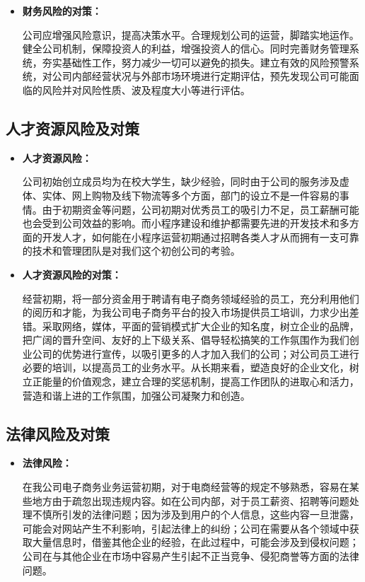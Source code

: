 \documentclass[UTF8,12pt]{ctexart}
\numberwithin{figure}{section}%
\begin{document}
\begin{spacing}{2}
\begin{itemize}
	\item \textbf{财务风险的对策：}
	
	公司应增强风险意识，提高决策水平。合理规划公司的运营，脚踏实地运作。健全公司机制，保障投资人的利益，增强投资人的信心。同时完善财务管理系统，夯实基础性工作，努力减少一切可以避免的损失。建立有效的风险预警系统，对公司内部经营状况与外部市场环境进行定期评估，预先发现公司可能面临的风险并对风险性质、波及程度大小等进行评估。
	
\end{itemize}
\subsection{人才资源风险及对策}

\begin{itemize}
	\item \textbf{人才资源风险：}
	
	公司初始创立成员均为在校大学生，缺少经验，同时由于公司的服务涉及虚体、实体、网上购物及线下物流等多个方面，部门的设立不是一件容易的事情。由于初期资金等问题，公司初期对优秀员工的吸引力不足，员工薪酬可能也会受到公司效益的影响。而小程序建设和维护都需要先进的开发技术和多方面的开发人才，如何能在小程序运营初期通过招聘各类人才从而拥有一支可靠的技术和管理团队是对我们这个初创公司的考验。
	
	\item \textbf{人才资源风险的对策：}
	
	经营初期，将一部分资金用于聘请有电子商务领域经验的员工，充分利用他们的阅历和才能，为我公司电子商务平台的投入市场提供员工培训，力求少出差错。采取网络，媒体，平面的营销模式扩大企业的知名度，树立企业的品牌，把广阔的晋升空间、友好的上下级关系、倡导轻松搞笑的工作氛围作为我们创业公司的优势进行宣传，以吸引更多的人才加入我们的公司；对公司员工进行必要的培训，以提高员工的业务水平。从长期来看，塑造良好的企业文化，树立正能量的价值观念，建立合理的奖惩机制，提高工作团队的进取心和活力，营造和谐上进的工作氛围，加强公司凝聚力和创造。
	
\end{itemize}

\subsection{法律风险及对策}

\begin{itemize}
	\item \textbf{法律风险：}
	
	在我公司电子商务业务运营初期，对于电商经营等的规定不够熟悉，容易在某些地方由于疏忽出现违规内容。如在公司内部，对于员工薪资、招聘等问题处理不慎所引发的法律问题；因为涉及到用户的个人信息，这些内容一旦泄露，可能会对网站产生不利影响，引起法律上的纠纷；公司在需要从各个领域中获取大量信息时，借鉴其他企业的经验，在此过程中，可能会涉及到侵权问题；公司在与其他企业在市场中容易产生引起不正当竞争、侵犯商誉等方面的法律问题。
	

\end{itemize}
\end{spacing}
\end{document}
